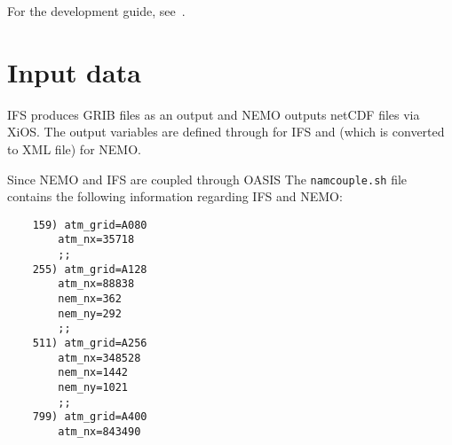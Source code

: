 For the development guide, see~\cite{dev-guide}.


\section{Input data}
IFS produces GRIB files as an output and NEMO outputs netCDF files via XiOS. 
The output variables are defined through  for IFS and  (which is converted to XML file) for NEMO.

Since NEMO and IFS are coupled through OASIS \cite{TM673}
The \texttt{namcouple.sh} file contains the following information regarding IFS and NEMO:

\begin{lstlisting}
    159) atm_grid=A080
        atm_nx=35718
        ;;
    255) atm_grid=A128
        atm_nx=88838
        nem_nx=362
        nem_ny=292
        ;;
    511) atm_grid=A256
        atm_nx=348528
        nem_nx=1442
        nem_ny=1021
        ;;
    799) atm_grid=A400
        atm_nx=843490  
\end{lstlisting}









